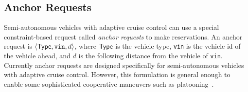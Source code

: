 
\subsection{Anchor Requests}
\label{sec:anchor}

Semi-autonomous vehicles with adaptive cruise control can use a special
constraint-based request called \emph{anchor requests} to make
reservations. An anchor request is $\langle {\sf Type}, \texttt{vin},
d \rangle$, where ${\sf Type}$ is the vehicle type, \texttt{vin} is
the vehicle id of the vehicle ahead, and $d$ is the following
distance from the vehicle of \texttt{vin}. 
Currently anchor requests are designed specifically for
semi-autonomous vehicles with adaptive cruise control.  However, this
formulation is general enough to enable some sophisticated cooperative
maneuvers such as platooning~\cite{bib:Sheikholeslam90Longitudinal}.











